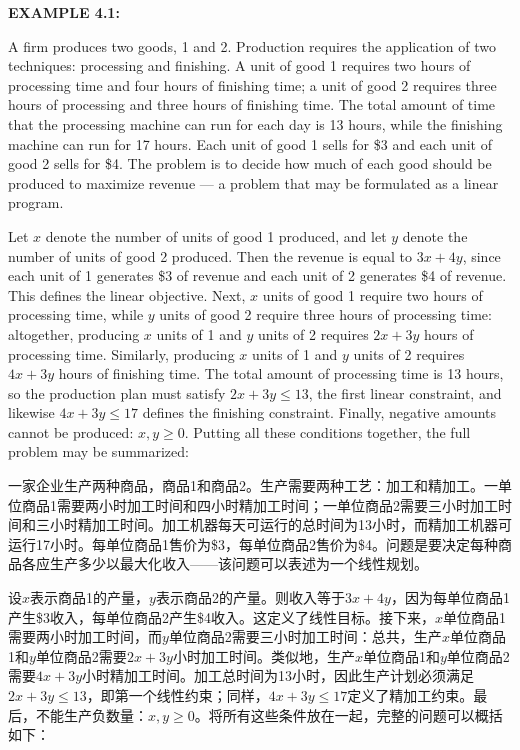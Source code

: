 \bigskip
\noindent\textbf{EXAMPLE 4.1:}
\begin{original}
A firm produces two goods, 1 and 2. Production requires the application of two techniques: processing and finishing. A unit of good 1 requires two hours of processing time and four hours of finishing time; a unit of good 2 requires three hours of processing and three hours of finishing time. The total amount of time that the processing machine can run for each day is 13 hours, while the finishing machine can run for 17 hours. Each unit of good 1 sells for \$3 and each unit of good 2 sells for \$4. The problem is to decide how much of each good should be produced to maximize revenue --- a problem that may be formulated as a linear program.

Let $x$ denote the number of units of good 1 produced, and let $y$ denote the number of units of good 2 produced. Then the revenue is equal to $3x + 4y$, since each unit of 1 generates \$3 of revenue and each unit of 2 generates \$4 of revenue. This defines the linear objective. Next, $x$ units of good 1 require two hours of processing time, while $y$ units of good 2 require three hours of processing time: altogether, producing $x$ units of 1 and $y$ units of 2 requires $2x + 3y$ hours of processing time. Similarly, producing $x$ units of 1 and $y$ units of 2 requires $4x + 3y$ hours of finishing time. The total amount of processing time is 13 hours, so the production plan must satisfy $2x + 3y \le 13$, the first linear constraint, and likewise $4x + 3y \le 17$ defines the finishing constraint. Finally, negative amounts cannot be produced: $x, y \ge 0$. Putting all these conditions together, the full problem may be summarized:
\end{original}
\begin{translation}
一家企业生产两种商品，商品1和商品2。生产需要两种工艺：加工和精加工。一单位商品1需要两小时加工时间和四小时精加工时间；一单位商品2需要三小时加工时间和三小时精加工时间。加工机器每天可运行的总时间为13小时，而精加工机器可运行17小时。每单位商品1售价为\$3，每单位商品2售价为\$4。问题是要决定每种商品各应生产多少以最大化收入——该问题可以表述为一个线性规划。

设$x$表示商品1的产量，$y$表示商品2的产量。则收入等于$3x+4y$，因为每单位商品1产生\$3收入，每单位商品2产生\$4收入。这定义了线性目标。接下来，$x$单位商品1需要两小时加工时间，而$y$单位商品2需要三小时加工时间：总共，生产$x$单位商品1和$y$单位商品2需要$2x+3y$小时加工时间。类似地，生产$x$单位商品1和$y$单位商品2需要$4x+3y$小时精加工时间。加工总时间为13小时，因此生产计划必须满足$2x+3y \le 13$，即第一个线性约束；同样，$4x+3y \le 17$定义了精加工约束。最后，不能生产负数量：$x, y \ge 0$。将所有这些条件放在一起，完整的问题可以概括如下：
\end{translation}

